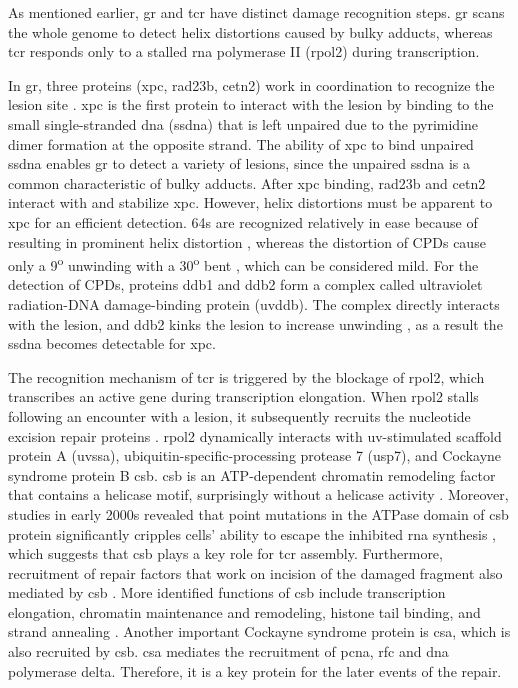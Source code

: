 As mentioned earlier, \gls{gr} and \gls{tcr} have distinct damage recognition steps. \gls{gr} scans the whole genome to detect helix distortions caused by bulky adducts, whereas \gls{tcr} responds only to a stalled \gls{rna} polymerase II (\gls{rpol2}) during transcription. 

In \gls{gr}, three proteins (\gls{xpc}, \gls{rad23b}, \gls{cetn2}) work in coordination to recognize the lesion site \citep{sugasawa1998xeroderma}. \gls{xpc} is the first protein to interact with the lesion by binding to the small single-stranded \gls{dna} (\gls{ssdna}) that is left unpaired due to the pyrimidine dimer formation at the opposite strand. The ability of \gls{xpc} to bind unpaired \gls{ssdna} enables \gls{gr} to detect a variety of lesions, since the unpaired \gls{ssdna} is a common characteristic of bulky adducts. After \gls{xpc} binding, \gls{rad23b} and \gls{cetn2} interact with and stabilize \gls{xpc}. However, helix distortions must be apparent to \gls{xpc} for an efficient detection. \gls{64}s are recognized relatively in ease because of resulting in prominent helix distortion \citep{mizukoshi2001structural}, whereas the distortion of \gls{CPD}s cause only a 9\textsuperscript{o} unwinding with a 30\textsuperscript{o} bent \citep{park2002crystal}, which can be considered mild. For the detection of \gls{CPD}s, proteins \gls{ddb1} and \gls{ddb2} form a complex called ultraviolet radiation-DNA damage-binding protein (\gls{uvddb}). The complex directly interacts with the lesion, and \gls{ddb2} kinks the lesion to increase unwinding \citep{scrima2008structural}, as a result the \gls{ssdna} becomes detectable for \gls{xpc}. 

The recognition mechanism of \gls{tcr} is triggered by the blockage of \gls{rpol2}, which transcribes an active gene during transcription elongation. When \gls{rpol2} stalls following an encounter with a lesion, it subsequently recruits the nucleotide excision repair proteins \citep{svejstrup2002mechanisms}. \gls{rpol2} dynamically interacts with \gls{uv}-stimulated scaffold protein A (\gls{uvssa}), ubiquitin-specific-processing protease 7 (\gls{usp7}), and Cockayne syndrome protein B \gls{csb}. \gls{csb} is an ATP-dependent chromatin remodeling factor that contains a helicase motif, surprisingly without a helicase activity \citep{selby1997human}. Moreover, studies in early 2000s revealed that point mutations in the ATPase domain of \gls{csb} protein significantly cripples cells' ability to escape the inhibited \gls{rna} synthesis \citep{citterio1998biochemical,muftuoglu2002phenotypic}, which suggests that \gls{csb} plays a key role for \gls{tcr} assembly. Furthermore, recruitment of repair factors that work on incision of the damaged fragment also mediated by \gls{csb} \citep{fousteri2006cockayne}. More identified functions of \gls{csb} include transcription elongation, chromatin maintenance and remodeling, histone tail binding, and strand annealing \citep{selby1997cockayne}. Another important Cockayne syndrome protein is \gls{csa}, which is also recruited by \gls{csb}. \gls{csa} mediates the recruitment of \gls{pcna}, \gls{rfc} and \gls{dna} polymerase \gls{delta}. Therefore, it is a key protein for the later events of the repair.

